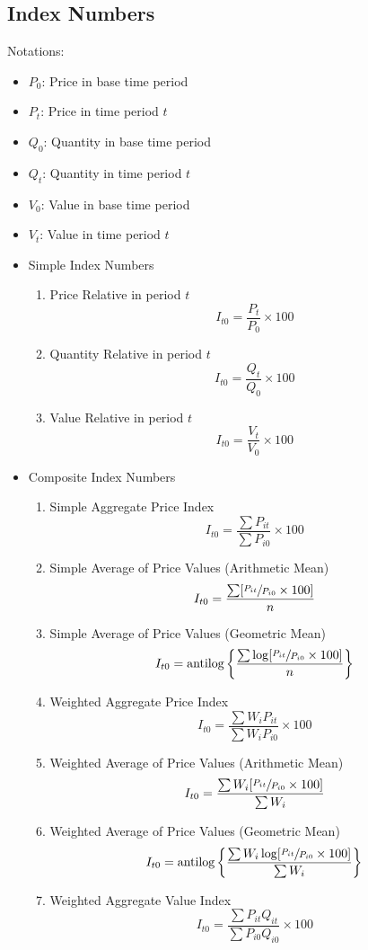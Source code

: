 \documentclass[
10pt, %
a4paper, %
]{report}
\begin{document}
\subsection{Index Numbers}
Notations:
\begin{itemize}
\item \(P_0\): Price in base time period
\item \(P_t\): Price in time period \(t\)
\item \(Q_0\): Quantity in base time period
\item \(Q_t\): Quantity in time period \(t\)
\item \(V_0\): Value in base time period
\item \(V_t\): Value in time period \(t\)
\end{itemize}
\begin{itemize}
\item Simple Index Numbers
\begin{enumerate}
\item Price Relative in period \(t\) \[I_{t0} = \frac{P_t}{P_0} \times 100\]
\item Quantity Relative in period \(t\) \[I_{t0} = \frac{Q_t}{Q_0} \times 100\]
\item Value Relative in period \(t\) \[I_{t0} = \frac{V_t}{V_0} \times 100\]
\end{enumerate}
\item Composite Index Numbers
\begin{enumerate}
\item Simple Aggregate Price Index \[I_{t0} = \frac{\sum P_{it}}{\sum P_{i0}} \times 100\]
\item Simple Average of Price Values (Arithmetic Mean) \[I_{t0} = \frac{\sum [\sfrac{P_{it}}{P_{i0}} \times 100]}{n}\]
\item Simple Average of Price Values (Geometric Mean) \[I_{t0} = \text{antilog} \left\{\frac{\sum \log [\sfrac{P_{it}}{P_{i0}} \times 100]}{n}\right\}\]
\item Weighted Aggregate Price Index \[I_{t0} = \frac{\sum W_i P_{it}}{\sum W_i P_{i0}} \times 100\]
\item Weighted Average of Price Values (Arithmetic Mean) \[I_{t0} = \frac{\sum W_i [\sfrac{P_{it}}{P_{i0}} \times 100]}{\sum W_i}\]
\item Weighted Average of Price Values (Geometric Mean) \[I_{t0} = \text{antilog} \left\{\frac{\sum W_i \log [\sfrac{P_{it}}{P_{i0}} \times 100]}{\sum W_i}\right\}\]
\item Weighted Aggregate Value Index \[I_{t0} = \frac{\sum P_{it} Q_{it}}{\sum P_{i0} Q_{i0}} \times 100\]

\end{enumerate}
\end{itemize}
\end{document}
